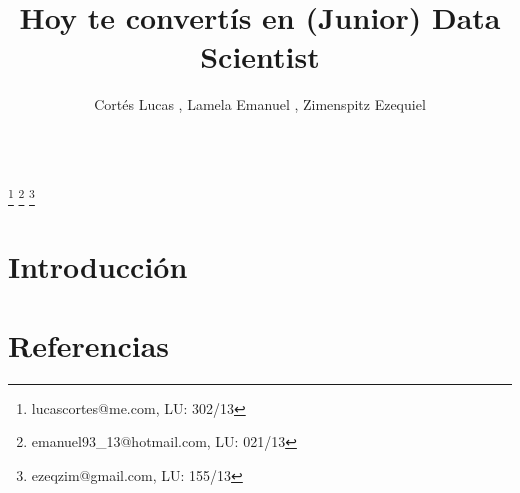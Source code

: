 \documentclass{endm}
\begin{document}
\begin{verbatim}\end{verbatim}\vspace{2.5cm}

\begin{frontmatter}

\title{Hoy te convert\'is en (Junior) Data Scientist}

\author{Cort\'es Lucas , Lamela Emanuel , Zimenspitz Ezequiel }
\address{Universidad de Buenos Aires\\ Buenos Aires, Argentina}

\thanks[lucasemail]{lucascortes@me.com, LU: 302/13}
\thanks[emanuelemail]{emanuel93\_13@hotmail.com, LU: 021/13}
\thanks[ezequielemail]{ezeqzim@gmail.com, LU: 155/13}

\begin{abstract}
\end{abstract}

\begin{keyword}
\end{keyword}

\end{frontmatter}

\section{Introducci\'on}\label{intro}








\section{Referencias}



\end{document}
